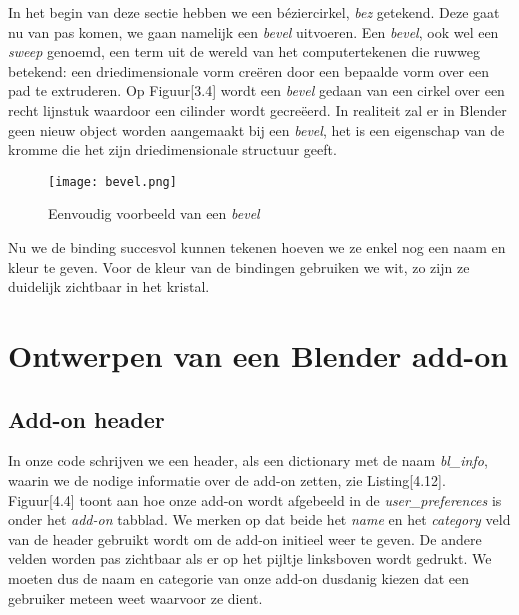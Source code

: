 

In het begin van deze sectie hebben we een béziercirkel, \textit{bez} getekend. Deze gaat nu van pas komen, we gaan namelijk een \textit{bevel} uitvoeren. Een \textit{bevel}, ook wel een \textit{sweep} genoemd, een term uit de wereld van het computertekenen die ruwweg betekend: een driedimensionale vorm creëren door een bepaalde vorm over een pad te extruderen. Op Figuur[3.4] wordt een \textit{bevel} gedaan van een cirkel over een recht lijnstuk waardoor een cilinder wordt gecreëerd. In realiteit zal er in Blender geen nieuw object worden aangemaakt bij een \textit{bevel}, het is een eigenschap van de kromme die het zijn driedimensionale structuur geeft.  

\begin{figure}[H]
\texttt{[image: bevel.png]}
\caption{Eenvoudig voorbeeld van een \textit{bevel}}
\end{figure}

Nu we de binding succesvol kunnen tekenen hoeven we ze enkel nog een naam en kleur te geven. Voor de kleur van de bindingen gebruiken we wit, zo zijn ze duidelijk zichtbaar in het kristal.

\section{Ontwerpen van een Blender add-on}

\subsection{Add-on header}

In onze code schrijven we een header, als een dictionary met de naam \textit{bl\_info}, waarin we de nodige informatie over de add-on zetten, zie Listing[4.12]. Figuur[4.4] toont aan hoe onze add-on wordt afgebeeld in de \textit{user\_preferences} is onder het \textit{add-on} tabblad. We merken op dat beide het \textit{name} en het \textit{category} veld van de header gebruikt wordt om de add-on initieel weer te geven. De andere velden worden pas zichtbaar als er op het pijltje linksboven wordt gedrukt. We moeten dus de naam en categorie van onze add-on dusdanig kiezen dat een gebruiker meteen weet waarvoor ze dient. 



